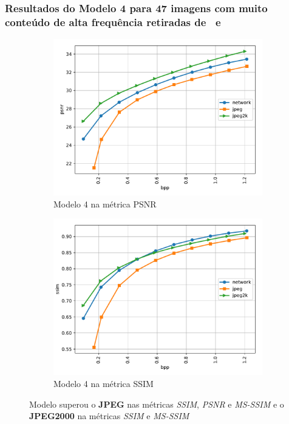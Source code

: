 \documentclass{beamer}
\begin{document}
\begin{frame}
\frametitle{Resultados do Modelo 4 para 47 imagens com muito conteúdo de alta frequência retiradas de~\cite{kodak} e~\cite{clic}}
\begin{figure}
\centering
\begin{subfigure}{.5\textwidth}
  \centering
  \includegraphics[width=.8\textwidth]{figs/_mean_plot_psnr_hf_10levels.pdf}
  \caption{Modelo 4 na métrica PSNR}
  \label{fig:mod4_2:sub1}
\end{subfigure}%
\begin{subfigure}{.5\textwidth}
  \centering
  \includegraphics[width=.8\textwidth]{figs/_mean_plot_ssim_hf_10levels.pdf}
  \caption{Modelo 4 na métrica SSIM}
  \label{fig:mod4_2:sub2}
\end{subfigure}
\caption{Modelo superou o \textbf{JPEG} nas métricas \textit{SSIM}, \textit{PSNR} e \textit{MS-SSIM} e o \textbf{JPEG2000} na métricas \textit{SSIM} e \textit{MS-SSIM}}
\label{fig:mod4_2}
\end{figure}
\end{frame}
\end{document}
